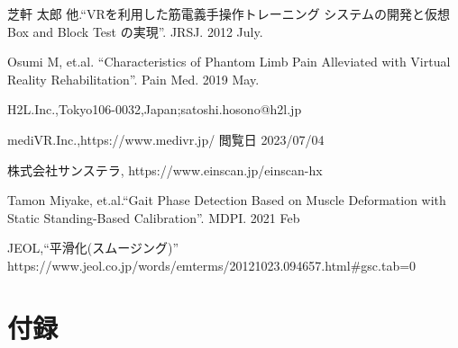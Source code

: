 \documentclass{ltjsreport}
\begin{document}
\begin{thebibliography}{99}

	芝軒 太郎 他.``VRを利用した筋電義手操作トレーニング
	システムの開発と仮想 Box and Block Test の実現''.
	JRSJ. 2012 July.

	Osumi M, et.al.
	``Characteristics of Phantom Limb Pain Alleviated
	with Virtual Reality Rehabilitation''.
	Pain Med. 2019 May.

	H2L.Inc.,Tokyo106-0032,Japan;satoshi.hosono@h2l.jp


	mediVR.Inc.,https://www.medivr.jp/
	閲覧日 2023/07/04
	
	
	株式会社サンステラ, https://www.einscan.jp/einscan-hx


	Tamon Miyake, et.al.``Gait Phase Detection Based on Muscle Deformation
	with Static Standing-Based Calibration''.
	MDPI. 2021 Feb


	JEOL,``平滑化(スムージング)''\\
	https://www.jeol.co.jp/words/emterms/20121023.094657.html\#gsc.tab=0

\end{thebibliography}
\chapter*{付録}

\end{document}
